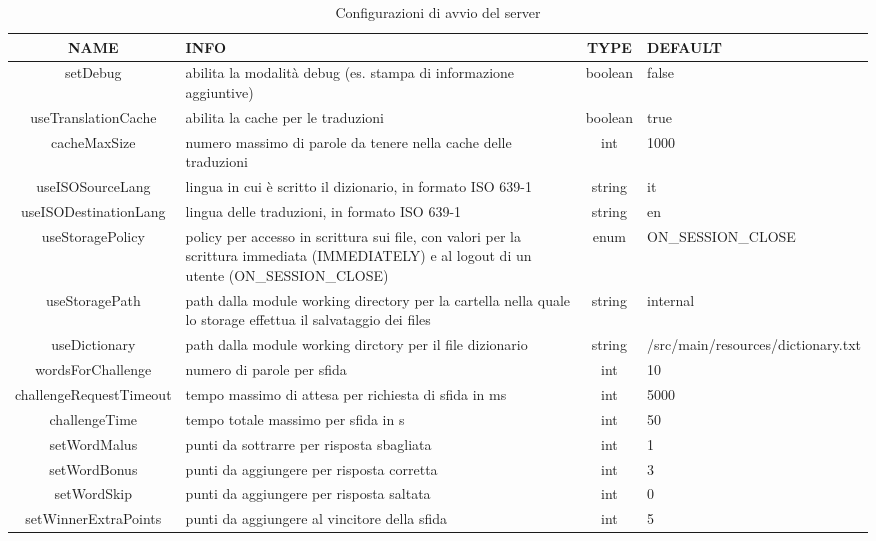 \documentclass{article}
\begin{document}
    \begin{table}[ht!]
        \centering
        \begin{tabular}{ |c|p{4cm}|c|p{4cm}| }
         \hline
         \textbf{NAME} & \textbf{INFO} & \textbf{TYPE} & \textbf{DEFAULT} \\
         \hline
         setDebug & abilita la modalità debug (es. stampa di informazione aggiuntive) & boolean & false \\
         \hline
         useTranslationCache & abilita la cache per le traduzioni & boolean & true \\
         \hline
         cacheMaxSize & numero massimo di parole da tenere nella cache delle traduzioni & int & 1000 \\
         \hline
         useISOSourceLang & lingua in cui è scritto il dizionario, in formato ISO 639-1 & string & it \\
         \hline
         useISODestinationLang & lingua delle traduzioni, in formato ISO 639-1 & string & en \\
         \hline
         useStoragePolicy & policy per accesso in scrittura sui file, con valori per la scrittura immediata (IMMEDIATELY) e al logout di un utente (ON\_SESSION\_CLOSE) & enum & ON\_SESSION\_CLOSE \\
         \hline
         useStoragePath & path dalla module working directory per la cartella nella quale lo storage effettua il salvataggio dei files & string & internal \\
         \hline
         useDictionary & path dalla module working dirctory per il file dizionario & string & /src/main/resources/\newline dictionary.txt \\
         \hline
         wordsForChallenge & numero di parole per sfida & int & 10 \\
         \hline
         challengeRequestTimeout & tempo massimo di attesa per richiesta di sfida in ms & int & 5000 \\
         \hline
         challengeTime & tempo totale massimo per sfida in s & int & 50 \\
         \hline
         setWordMalus & punti da sottrarre per risposta sbagliata & int & 1 \\
         \hline
         setWordBonus & punti da aggiungere per risposta corretta & int & 3 \\
         \hline
         setWordSkip & punti da aggiungere per risposta saltata & int & 0 \\
         \hline
         setWinnerExtraPoints & punti da aggiungere al vincitore della sfida & int & 5 \\
         \hline
        \end{tabular}
        \caption{Configurazioni di avvio del server}
        \label{table:server_config_options}
    \end{table}
\end{document}
